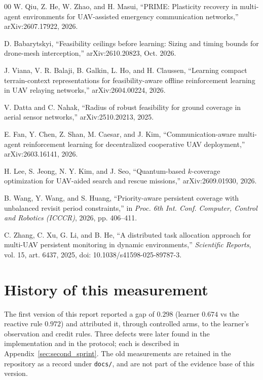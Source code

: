 \documentclass[conference]{IEEEtran}
\begin{document}
\begin{thebibliography}{00}
W. Qiu, Z. He, W. Zhao, and H. Masui, ``PRIME: Plasticity recovery in multi-agent environments for UAV-assisted emergency communication networks,'' arXiv:2607.17922, 2026.

D. Babarytskyi, ``Feasibility ceilings before learning: Sizing and timing bounds for drone-mesh interception,'' arXiv:2610.20823, Oct. 2026.

J. Viana, V. R. Balaji, B. Galkin, L. Ho, and H. Claussen, ``Learning compact terrain-context representations for feasibility-aware offline reinforcement learning in UAV relaying networks,'' arXiv:2604.00224, 2026.

V. Datta and C. Nahak, ``Radius of robust feasibility for ground coverage in aerial sensor networks,'' arXiv:2510.20213, 2025.

E. Fan, Y. Chen, Z. Shan, M. Caesar, and J. Kim, ``Communication-aware multi-agent reinforcement learning for decentralized cooperative UAV deployment,'' arXiv:2603.16141, 2026.

H. Lee, S. Jeong, N. Y. Kim, and J. Seo, ``Quantum-based $k$-coverage optimization for UAV-aided search and rescue missions,'' arXiv:2609.01930, 2026.

B. Wang, Y. Wang, and S. Huang, ``Priority-aware persistent coverage with unbalanced revisit period constraints,'' in \emph{Proc. 6th Int. Conf. Computer, Control and Robotics (ICCCR)}, 2026, pp. 406--411.

C. Zhang, C. Xu, G. Li, and B. He, ``A distributed task allocation approach for multi-UAV persistent monitoring in dynamic environments,'' \emph{Scientific Reports}, vol. 15, art. 6437, 2025, doi: 10.1038/s41598-025-89787-3.

\end{thebibliography}
\appendix
\section{History of this measurement}
\label{sec:history}

The first version of this report reported a gap of $0.298$ (learner $0.674$
vs the reactive rule $0.972$) and attributed it, through controlled arms, to
the learner's observation and credit rules.  Three defects were later found
in the implementation and in the protocol; each is described in
Appendix~\ref{sec:second_sprint}.  The old measurements are retained in the
repository as a record under \texttt{docs/}, and are not part of the evidence
base of this version.
\end{document}
